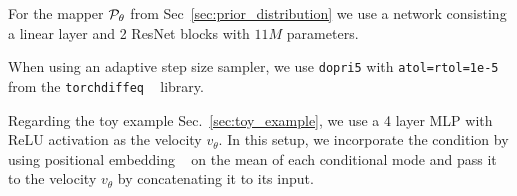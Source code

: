 For the mapper ${\mathcal{P}}_\theta$ from Sec~\ref{sec:prior_distribution} we use a network consisting a linear layer and 2 ResNet blocks with $11M$ parameters.

When using an adaptive step size sampler, we use \texttt{dopri5} with \texttt{atol=rtol=1e-5} from the \texttt{torchdiffeq} ~\citep{torchdiffeq} library.

Regarding the toy example Sec.~\ref{sec:toy_example}, we use a 4 layer MLP with ReLU activation as the velocity $v_\theta$. In this setup, we incorporate the condition by using positional embedding ~\cite{vaswani2023attentionneed} on the mean of each conditional mode and pass it to the velocity $v_\theta$ by concatenating it to its input. 


